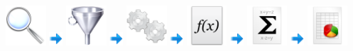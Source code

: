 \begin{frame}
   \includegraphics[width=15mm]{../image/magnify}
   \includegraphics[width=5mm]{../image/next}
   \includegraphics[width=15mm]{../image/filter}
   \includegraphics[width=5mm]{../image/next}
   \includegraphics[width=15mm]{../image/exec}
   \includegraphics[width=5mm]{../image/next}
   \includegraphics[width=15mm]{../image/funct}
   \includegraphics[width=5mm]{../image/next}
   \includegraphics[width=15mm]{../image/aggregate}
   \includegraphics[width=5mm]{../image/next}
   \includegraphics[width=15mm]{../image/spreadsheet_document}

\end{frame}

